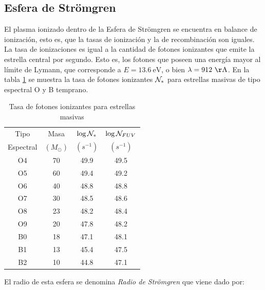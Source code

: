 \subsection{Esfera de Strömgren}

El plasma ionizado dentro de la Esfera de Strömgren se encuentra en balance de ionización, esto es, que la tasas de ionización y la de recombinación son iguales. La tasa de ionizaciones es igual a la cantidad de fotones ionizantes que emite la estrella central por segundo. Esto es, los fotones que poseen una energía mayor al límite de Lymann, que corresponde a  $E = 13.6\mathrm{~eV}$, o bien $\lambda = 912\mathrm{~\AA}$. En la tabla \ref{tab:ionizing-radiation} se muestra la tasa de fotones ionizantes $\mathcal{N}_*$ para estrellas masivas de tipo espectral O y B temprano.

\begin{table}
  \begin{tabular}{cccc} \hline 
    Tipo & Masa & $\log \mathcal{N}_*$ & $\log \mathcal{N}_{FUV}$ \\
    Espectral & $(M_\odot)$ & $(s^{-1})$ & $(s^{-1})$  \\
    \hline
    O4 & 70 & 49.9 & 49.5 \\
    O5 & 60 & 49.4 & 49.2 \\
    O6 & 40 & 48.8 & 48.8 \\
    O7 & 30 & 48.5 & 48.6 \\
    O8 & 23 & 48.2 & 48.4 \\
    O9 & 20 & 47.8 & 48.2 \\
    B0 & 18 & 47.1 & 48.1 \\
    B1 & 13 & 45.4 & 47.5 \\
    B2 & 10 & 44.8 & 47.1 \\
    \hline
  \end{tabular}
  \caption{Tasa de fotones ionizantes para estrellas masivas \citep{Stahler:2004}}
  \label{tab:ionizing-radiation}
\end{table}

El radio de esta esfera se denomina \textit{Radio de Strömgren} que viene dado por:




